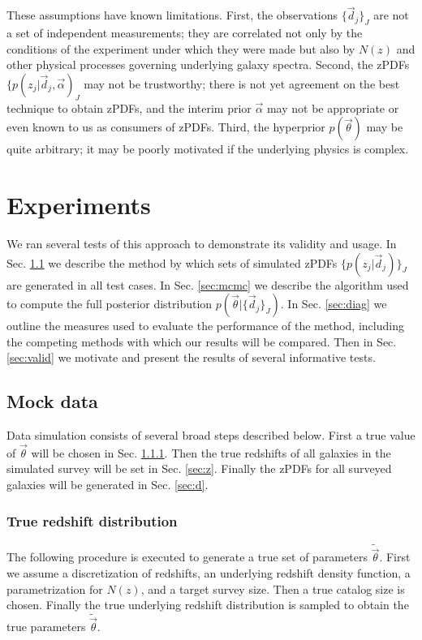\documentclass[preprint]{aastex}
\begin{document}
These assumptions have known limitations.  First, the observations $\{\vec{d}_{j}\}_{J}$ are not a set of independent measurements; they are correlated not only by the conditions of the experiment under which they were made but also by $N(z)$ and other physical processes governing underlying galaxy spectra.  Second, the zPDFs $\{p(z_{j}|\vec{d}_{j},\vec{\alpha})_{J}$ may not be trustworthy; there is not yet agreement on the best technique to obtain zPDFs, and the interim prior $\vec{\alpha}$ may not be appropriate or even known to us as consumers of zPDFs.  Third, the hyperprior $p(\vec{\theta})$ may be quite arbitrary; it may be poorly motivated if the underlying physics is complex.

\clearpage
\section{Experiments}
\label{sec:exp}

We ran several tests of this approach to demonstrate its validity and usage.  In Sec. \ref{sec:mock} we describe the method by which sets of simulated zPDFs $\{p(z_{j}|\vec{d}_{j})\}_{J}$ are generated in all test cases.  In Sec. \ref{sec:mcmc} we describe the algorithm used to compute the full posterior distribution $p(\vec{\theta}|\{\vec{d}_{j}\}_{J})$.  In Sec. \ref{sec:diag} we outline the measures used to evaluate the performance of the method, including the competing methods with which our results will be compared.  Then in Sec. \ref{sec:valid} we motivate and present the results of several informative tests.

\clearpage
\subsection{Mock data}
\label{sec:mock}

Data simulation consists of several broad steps described below.  First a true value of $\vec{\theta}$ will be chosen in Sec. \ref{sec:theta}.  Then the true redshifts of all galaxies in the simulated survey will be set in Sec. \ref{sec:z}.  Finally the zPDFs for all surveyed galaxies will be generated in Sec. \ref{sec:d}.

\clearpage
\subsubsection{True redshift distribution}
\label{sec:theta}

The following procedure is executed to generate a true set of parameters $\tilde{\vec{\theta}}$.  First we assume a discretization of redshifts, an underlying redshift density function, a parametrization for $N(z)$, and a target survey size.  Then a true catalog size is chosen.  Finally the true underlying redshift distribution is sampled to obtain the true parameters $\tilde{\vec{\theta}}$.
\end{document}
